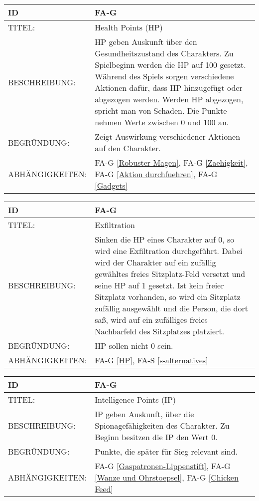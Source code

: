 \begin{tabularx}{16cm}{l|X}
	{table}\label{HP}
	\textbf{ID} & \textbf{FA-G \arabic{table}} \\
	\hline
	TITEL: & Health Points (HP) \\
	\hline
	BESCHREIBUNG: & HP geben Auskunft über den Gesundheitszustand des Charakters. Zu Spielbeginn werden die HP auf 100 gesetzt. Während des Spiels sorgen verschiedene Aktionen dafür, dass HP hinzugefügt oder abgezogen werden. Werden HP abgezogen, spricht man von Schaden. Die Punkte nehmen Werte zwischen 0 und 100 an.\\
	\hline
	BEGRÜNDUNG: & Zeigt Auswirkung verschiedener Aktionen auf den Charakter. \\
	\hline
	ABHÄNGIGKEITEN: & FA-G \ref{Robuster Magen}, FA-G \ref{Zaehigkeit}, FA-G \ref{Aktion durchfuehren}, FA-G \ref{Gadgets}\\
\end{tabularx}

\begin{tabularx}{16cm}{l|X}
	{table}\label{Exfiltratation}
	\textbf{ID} & \textbf{FA-G \arabic{table}} \\
	\hline
	TITEL: & Exfiltration \\
	\hline
	BESCHREIBUNG: & Sinken die HP eines Charakter auf 0, so wird eine Exfiltration durchgeführt. Dabei wird der Charakter auf ein zufällig gewähltes freies Sitzplatz-Feld versetzt und seine HP auf 1 gesetzt. Ist kein freier Sitzplatz vorhanden, so wird ein Sitzplatz zufällig ausgewählt und die Person, die dort saß, wird auf ein zufälliges freies Nachbarfeld des Sitzplatzes platziert.\\
	\hline
	BEGRÜNDUNG: & HP sollen nicht 0 sein.\\
	\hline
	ABHÄNGIGKEITEN: & FA-G \ref{HP}, FA-S \ref{s-alternatives}\\
\end{tabularx}

\begin{tabularx}{16cm}{l|X}
	{table}\label{IP}
	\textbf{ID} & \textbf{FA-G \arabic{table}} \\
	\hline
	TITEL: & Intelligence Points (IP) \\
	\hline
	BESCHREIBUNG: & IP geben Auskunft, über die Spionagefähigkeiten des Charakter. Zu Beginn besitzen die IP den Wert 0.\\
	\hline
	BEGRÜNDUNG: & Punkte, die später für Sieg relevant sind.\\
	\hline
	ABHÄNGIGKEITEN: & FA-G \ref{Gaspatronen-Lippenstift}, FA-G \ref{Wanze und Ohrstoepsel}, FA-G \ref{Chicken Feed} \todo[inline]{2.7 Geheimnisse}\\
\end{tabularx}


